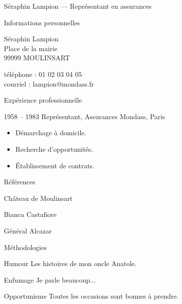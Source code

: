 \documentclass[a4paper,11pt]{article}
\begin{document}

\begin{cv}{Séraphin Lampion --- Représentant en assurances}

\begin{cvlist}{Informations personnelles}

\item Séraphin Lampion \\
      Place de la mairie \\
      99999 MOULINSART

\item téléphone : 01 02 03 04 05 \\
      courriel : lampion@mondass.fr

\end{cvlist}

\begin{cvlist}{Expérience professionnelle}

\item[1958 -- 1983] Représentant, Assurances Mondass, Paris
                    \begin{itemize}
                    \item Démarchage à domicile.
                    \item Recherche d'opportunités.
                    \item Établissement de contrats.
                    \end{itemize}

\end{cvlist}

\begin{cvlist}{Références}

\item Château de Moulinsart

\item Bianca Castafiore

\item Général Alcazar

\end{cvlist}

\begin{cvlist}{Méthodologies}

\item[Humour] Les histoires de mon oncle Anatole.

\item[Enfumage] Je parle beaucoup...

\item[Opportunisme] Toutes les occasions sont bonnes à
                    prendre.


\end{cvlist}
\end{cv}
\end{document}
